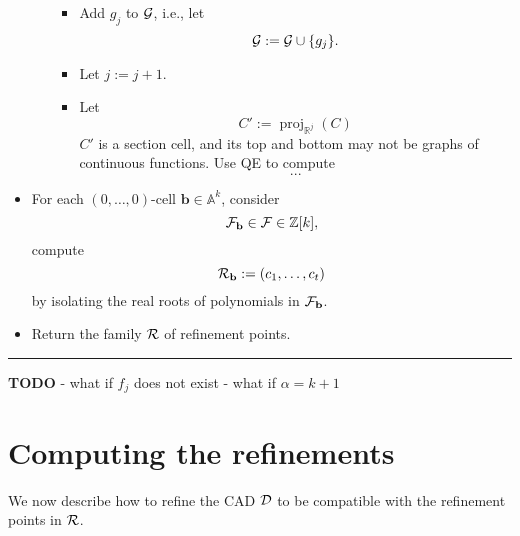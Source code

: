 \documentclass[
]{book}
\theoremstyle{definition}
\theoremstyle{definition}
\theoremstyle{definition}
\theoremstyle{definition}
\theoremstyle{remark}
\begin{document}
\begin{itemize}
\begin{itemize}
    \begin{itemize}
    \item
      Add \(g_j\) to \(\cal G\), i.e., let
      \[
      {\cal G} := {\cal G} \cup \{ g_j \}.
      \]
    \item
      Let \(j := j+1\).
    \item
      Let
      \[
      C' := {\operatorname{proj}_{\mathbb{R}^{j}}}(C)
      \]
      \(C'\) is a section cell, and its top and bottom may not be graphs of continuous functions. Use QE to compute
      \[
      ...
      \]
    \end{itemize}
  \end{itemize}
\item
  For each \((0,\ldots,0)\)-cell \(\mathbf{b} \in \mathbb{A}^k\), consider
  \[
  {\cal F}_{\mathbf{b}} \in {\cal F} \in \mathbb{Z}[k],
  \]
  compute
  \[
  {\cal R}_{\mathbf{b}} := (c_1,\ldots,c_t)
  \]
  by isolating the real roots of polynomials in \({\cal F}_{\mathbf{b}}\).
\item
  Return the family \({\cal R}\) of refinement points.
\end{itemize}

\begin{center}\rule{0.5\linewidth}{0.5pt}\end{center}

\textbf{TODO}
- what if \(f_j\) does not exist
- what if \(\alpha = k+1\)

\hypertarget{sec:compute-refinement}{%
\section{Computing the refinements}\label{sec:compute-refinement}}

We now describe how to refine the CAD \(\cal D\) to be compatible with the refinement points in \(\cal R\).
\end{document}
